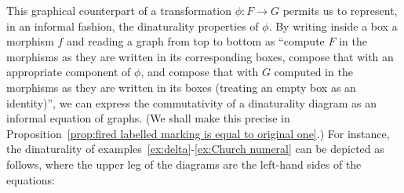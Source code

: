 \label{discussion:informal-reading-morphisms-in-a-box}This graphical counterpart of a transformation $\phi \colon F \to G$ permits us to represent, in an informal fashion, the dinaturality properties of $\phi$. By writing inside a box a morphism $f$ and reading a graph from top to bottom as ``compute $F$ in the morphisms as they are written in its corresponding boxes, compose that with an appropriate component of $\phi$, and compose that with $G$ computed in the morphisms as they are written in its boxes (treating an empty box as an identity)'', we can express the commutativity of a dinaturality diagram as an informal equation of graphs. (We shall make this precise in Proposition~\ref{prop:fired labelled marking is equal to original one}.) For instance, the dinaturality of examples~\ref{ex:delta}-\ref{ex:Church numeral} can be depicted as follows, where the upper leg of the diagrams are the left-hand sides of the equations:
